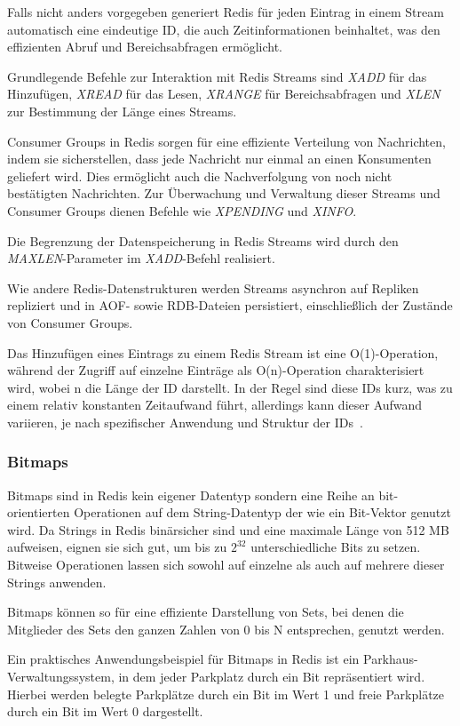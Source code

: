 Falls nicht anders vorgegeben generiert Redis für jeden Eintrag in einem Stream automatisch eine eindeutige ID, die auch Zeitinformationen beinhaltet, was den effizienten Abruf und Bereichsabfragen ermöglicht.

Grundlegende Befehle zur Interaktion mit Redis Streams sind \emph{XADD} für das Hinzufügen, \emph{XREAD} für das Lesen, \emph{XRANGE} für Bereichsabfragen und \emph{XLEN} zur Bestimmung der Länge eines Streams.

Consumer Groups in Redis sorgen für eine effiziente Verteilung von Nachrichten, indem sie sicherstellen, dass jede Nachricht nur einmal an einen Konsumenten geliefert wird. Dies ermöglicht auch die Nachverfolgung von noch nicht bestätigten Nachrichten. Zur Überwachung und Verwaltung dieser Streams und Consumer Groups dienen Befehle wie \emph{XPENDING} und \emph{XINFO}.

Die Begrenzung der Datenspeicherung in Redis Streams wird durch den \emph{MAXLEN}-Parameter im \emph{XADD}-Befehl realisiert.

Wie andere Redis-Datenstrukturen werden Streams asynchron auf Repliken repliziert und in AOF- sowie RDB-Dateien persistiert, einschließlich der Zustände von Consumer Groups.

Das Hinzufügen eines Eintrags zu einem Redis Stream ist eine O(1)-Operation, während der Zugriff auf einzelne Einträge als O(n)-Operation charakterisiert wird, wobei n die Länge der ID darstellt. In der Regel sind diese IDs kurz, was zu einem relativ konstanten Zeitaufwand führt, allerdings kann dieser Aufwand variieren, je nach spezifischer Anwendung und Struktur der IDs~\cite{redis_ltd_streams_nodate}.

\subsubsection{Bitmaps}
Bitmaps sind in Redis kein eigener Datentyp sondern eine Reihe an bit-orientierten Operationen auf dem String-Datentyp der wie ein Bit-Vektor genutzt wird. Da Strings in Redis binärsicher sind und eine maximale Länge von 512 MB aufweisen, eignen sie sich gut, um bis zu \(2^{32}\) unterschiedliche Bits zu setzen.
Bitweise Operationen lassen sich sowohl auf einzelne als auch auf mehrere dieser Strings anwenden.

Bitmaps können so für eine effiziente Darstellung von Sets, bei denen die Mitglieder des Sets den ganzen Zahlen von 0 bis N entsprechen, genutzt werden.

Ein praktisches Anwendungsbeispiel für Bitmaps in Redis ist ein Parkhaus-Verwaltungssystem, in dem jeder Parkplatz durch ein Bit repräsentiert wird. Hierbei werden belegte Parkplätze durch ein Bit im Wert 1 und freie Parkplätze durch ein Bit im Wert 0 dargestellt.

